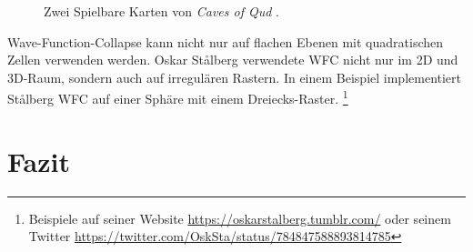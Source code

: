 \documentclass[12pt, a4paper,twoside,openany]{report} %
\begin{document}
\begin{figure}[H]
    \centering
    \caption{Zwei Spielbare Karten von \textit{Caves of Qud} \cite{Karth2017WaveFunctionCollapseIC}.}%
\end{figure}

Wave-Function-Collapse kann nicht nur auf flachen Ebenen mit quadratischen Zellen verwenden werden.
Oskar Stålberg verwendete WFC nicht nur im 2D und 3D-Raum, sondern auch auf irregulären Rastern.
In einem Beispiel implementiert Stålberg WFC auf einer Sphäre mit einem Dreiecks-Raster.
\footnote[7]{Beispiele auf seiner Website
\url{https://oskarstalberg.tumblr.com/}
oder seinem Twitter
\url{https://twitter.com/OskSta/status/784847588893814785}}

\chapter{Fazit}
\end{document}
